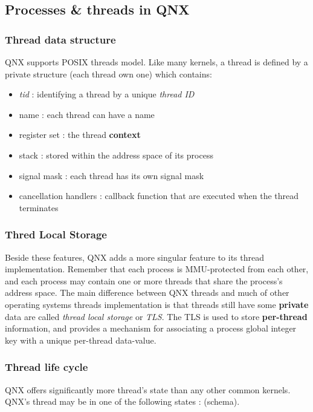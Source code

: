 \subsection{Processes \& threads in QNX}


\begin{frame}
\frametitle{Thread data structure}

QNX supports POSIX threads model. Like many kernels, a thread is defined by a private structure (each thread own one) which contains:

\-

\begin{itemize}
\item
\textit{tid} : identifying a thread by a unique \textit{thread ID}
\item
name : each thread can have a name
\item
register set : the thread \textbf{context}
\item
stack : stored within the address space of its process
\item
signal mask : each thread has its own signal mask
\item
cancellation handlers : callback function that are executed when the thread terminates
\end{itemize}

\end{frame}


\begin{frame}
\frametitle{Thred Local Storage}

Beside these features, QNX adds a more singular feature to its thread implementation. Remember that each process is MMU-protected from each other, and each process may contain one or more threads that share the process's address space. The main difference between QNX threads and much of other operating systems threads implementation is that threads still have some \textbf{private} data are called \textit{thread local storage} or \textit{TLS}. The TLS is used to store \textbf{per-thread} information, and provides a mechanism for associating a process global integer key with a unique per-thread data-value.

\end{frame}


\begin{frame}
\frametitle{Thread life cycle}

QNX offers significantly more thread's state than any other common kernels. QNX's thread may be in one of the following states : (schema).

\end{frame}






